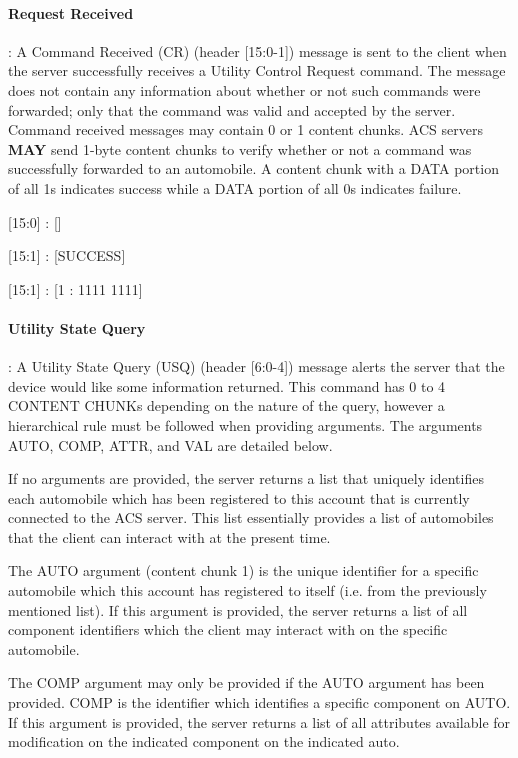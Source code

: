 \paragraph{Request Received}: A Command Received (CR) (header [15:0-1]) message is sent to the client when the server successfully receives a Utility Control Request command. The message does not contain any information
about whether or not such commands were forwarded; only that the command was valid and accepted by the server. Command received messages may contain 0 or 1 content chunks. ACS servers \textbf{MAY} send 1-byte content chunks to verify whether or not a command was successfully forwarded to an automobile. A content chunk with a DATA portion of all 1s indicates success while a DATA portion of all 0s indicates failure.

\begin{center}
{\textsf{[15:0] : []}}

{\textsf{[15:1] : [SUCCESS]}}

{\textsf{[15:1] : [1 : 1111 1111]}}
\end{center}

\paragraph{Utility State Query}: A Utility State Query (USQ) (header [6:0-4]) message alerts the server that the device would like some information returned. This command has 0 to 4 CONTENT CHUNKs depending on the nature of the query, however a hierarchical rule must be followed when providing arguments. The arguments AUTO, COMP, ATTR, and VAL are detailed below.

If no arguments are provided, the server returns a list that uniquely identifies each automobile which has been registered to this account that is currently connected to the ACS server.  This list essentially provides a list of automobiles that the client can interact with at the present time.

The AUTO argument (content chunk 1) is the unique identifier for a specific automobile which this account has registered to itself (i.e. from the previously mentioned list). If this argument is provided, the server returns a list of all component identifiers which the client may interact with on the specific automobile.

The COMP argument may only be provided if the AUTO argument has been provided. COMP is the identifier which identifies a specific component on AUTO. If this argument is provided, the server returns a list of all attributes available for modification on the indicated component on the indicated auto.

